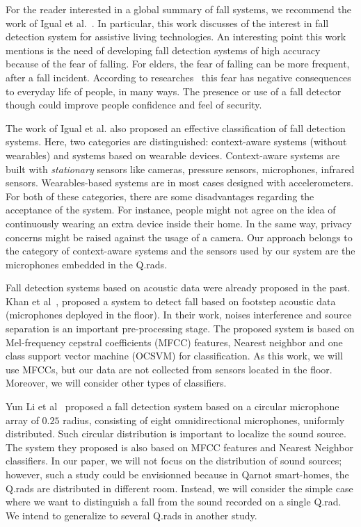 \documentclass[10pt, conference, compsocconf]{IEEEtran}
\begin{document}
For the reader interested in a global summary of fall systems, we recommend the 
work of Igual et al.~\cite{Igual2013}. In particular, this work discusses of the interest in fall detection system for assistive 
living technologies. An interesting point this work mentions is the need of developing fall detection systems of high accuracy 
because of the fear of falling. For elders, the fear of falling  can be more frequent, after a fall incident. According to 
researches~\cite{FearofFalling} this fear has negative consequences to everyday life of people, in many ways. The presence or use of a fall detector though could improve people confidence and feel of security. 

The work of Igual et al. also proposed an effective classification of fall detection systems. Here, two categories are 
distinguished: context-aware systems (without wearables) and systems based on wearable devices. Context-aware systems are built with 
{\it stationary} sensors like cameras, pressure sensors, microphones, infrared sensors. Wearables-based systems are in most cases 
designed with accelerometers. For both of these categories, there are some disadvantages regarding the acceptance of the system. 
For instance, people might not agree on the idea of continuously wearing an extra device inside their home. In the same way, 
privacy concerns might be raised against the usage of a camera. 
Our approach belongs to the category of context-aware systems and the sensors used by our system are the microphones embedded in the Q.rads. 

Fall detection systems based on acoustic data were already proposed in the past. Khan et al~\cite{Muhammad2014}, proposed a 
system to detect fall based on footstep acoustic data (microphones deployed in the floor). In their work, noises interference and 
source separation is an important pre-processing stage. The proposed system is based on Mel-frequency cepstral coefficients (MFCC) 
features, Nearest neighbor and one class support vector machine (OCSVM) for classification. As this work, we will use MFCCs, 
but our data are not collected from sensors located in the floor. Moreover, we will consider other types of classifiers. 

Yun Li et al~\cite{Yun2012} proposed a fall detection system based on a circular microphone array of $0.25$ radius, consisting of eight omnidirectional microphones, uniformly distributed. Such circular distribution is important to localize the sound source. The 
system they proposed is also based on MFCC features and Nearest Neighbor classifiers. In our paper, we will not focus on the distribution 
of sound sources; however, such a study could be envisionned because in Qarnot smart-homes, the Q.rads are distributed in different room. 
Instead, we will consider the simple case where we want to distinguish a fall from the sound recorded on a single Q.rad. We intend 
to generalize to several Q.rads in another study.  
\end{document}
